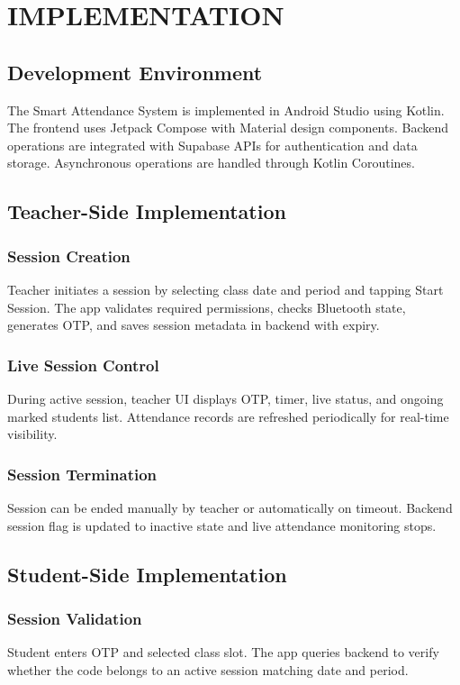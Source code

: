\chapter{IMPLEMENTATION} \label{c5}
\section{Development Environment}
The Smart Attendance System is implemented in Android Studio using Kotlin. The frontend uses Jetpack Compose with Material design components. Backend operations are integrated with Supabase APIs for authentication and data storage. Asynchronous operations are handled through Kotlin Coroutines.

\section{Teacher-Side Implementation}
\subsection{Session Creation}
Teacher initiates a session by selecting class date and period and tapping Start Session. The app validates required permissions, checks Bluetooth state, generates OTP, and saves session metadata in backend with expiry.

\subsection{Live Session Control}
During active session, teacher UI displays OTP, timer, live status, and ongoing marked students list. Attendance records are refreshed periodically for real-time visibility.

\subsection{Session Termination}
Session can be ended manually by teacher or automatically on timeout. Backend session flag is updated to inactive state and live attendance monitoring stops.

\section{Student-Side Implementation}
\subsection{Session Validation}
Student enters OTP and selected class slot. The app queries backend to verify whether the code belongs to an active session matching date and period.

